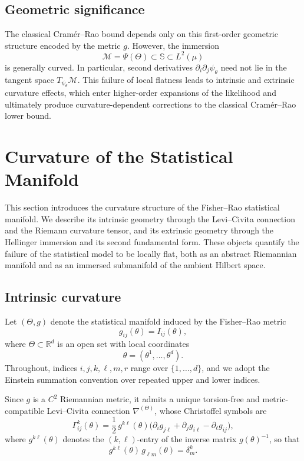 \documentclass[11pt,letterpaper]{amsart}
\numberwithin{equation}{section}
\theoremstyle{plain}
\theoremstyle{definition}
\theoremstyle{remark}
\begin{document}
\subsection{Geometric significance}

The classical Cram\'er--Rao bound depends only on this first-order geometric structure encoded by the metric \(g\). However, the immersion
\[
\mathcal M=\Psi(\Theta)\subset \mathbb S\subset L^2(\mu)
\]
is generally curved. In particular, second derivatives \(\partial_i\partial_j\psi_\theta\) need not lie in the tangent space \(T_{\psi_\theta}\mathcal M\). This failure of local flatness leads to intrinsic and extrinsic curvature effects, which enter higher-order expansions of the likelihood and ultimately produce curvature-dependent corrections to the classical Cram\'er--Rao lower bound.

\section{Curvature of the Statistical Manifold}\label{curv_manifold}

This section introduces the curvature structure of the Fisher--Rao statistical manifold. We describe its intrinsic geometry through the Levi--Civita connection and the Riemann curvature tensor, and its extrinsic geometry through the Hellinger immersion and its second fundamental form. These objects quantify the failure of the statistical model to be locally flat, both as an abstract Riemannian manifold and as an immersed submanifold of the ambient Hilbert space.

\subsection{Intrinsic curvature}

Let \((\Theta,g)\) denote the statistical manifold induced by the Fisher--Rao metric
\[
g_{ij}(\theta)=I_{ij}(\theta),
\]
where \(\Theta\subset\mathbb{R}^d\) is an open set with local coordinates
\[
\theta=(\theta^1,\dots,\theta^d).
\]
Throughout, indices \(i,j,k,\ell,m,r\) range over \(\{1,\dots,d\}\), and we adopt the Einstein summation convention over repeated upper and lower indices.

Since \(g\) is a \(C^2\) Riemannian metric, it admits a unique torsion-free and metric-compatible Levi--Civita connection \(\nabla^{(\Theta)}\), whose Christoffel symbols are
\begin{equation*}
\Gamma^{k}_{ij}(\theta)
=
\frac{1}{2}\, g^{k\ell}(\theta)
\big(
\partial_i g_{j\ell}
+
\partial_j g_{i\ell}
-
\partial_\ell g_{ij}
\big),
\end{equation*}
where \(g^{k\ell}(\theta)\) denotes the \((k,\ell)\)-entry of the inverse matrix \(g(\theta)^{-1}\), so that
\[
g^{k\ell}(\theta)\,g_{\ell m}(\theta)=\delta^k_m.
\]
\end{document}
